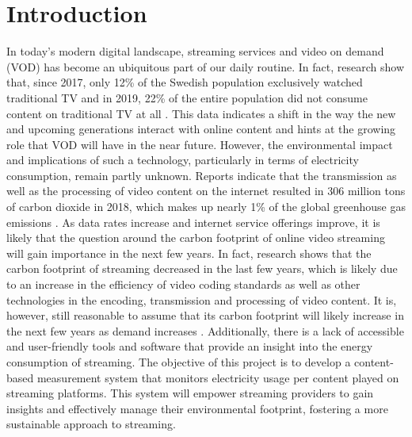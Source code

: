 \label{sec:introduction}
\section{Introduction}

In today's modern digital landscape, streaming services and video on demand (VOD) has become an ubiquitous part of our daily routine. In fact, research show that, since 2017, only 12\% of the Swedish population exclusively watched traditional TV and in 2019, 22\% of the entire population did not consume content on traditional TV at all \cite{a2020_anvndning}. This data indicates a shift in the way the new and upcoming generations interact with online content and hints at the growing role that VOD will have in the near future. However, the environmental impact  and implications of such a technology, particularly in terms of electricity consumption, remain partly unknown. Reports indicate that the transmission as well as the processing of video content on the internet resulted in 306 million tons of carbon dioxide in 2018, which makes up nearly 1\% of the global greenhouse gas emissions \cite{efoui2019climate}. As data rates increase and internet service offerings improve, it is likely that the question around the carbon footprint of online video streaming will gain importance in the next few years. In fact, research shows that the carbon footprint of streaming decreased in the last few years, which is likely due to an increase in the efficiency of video coding standards as well as other technologies in the encoding, transmission and processing of video content. It is, however, still reasonable to assume that its carbon footprint will likely increase in the next few years as demand increases \cite{kamiya2020carbon}. Additionally, there is a lack of accessible and user-friendly tools and software that provide an insight into the energy consumption of streaming. The objective of this project is to develop a content-based measurement system that monitors electricity usage per content played on streaming platforms. This system will empower streaming providers to gain insights and effectively manage their environmental footprint, fostering a more sustainable approach to streaming.


